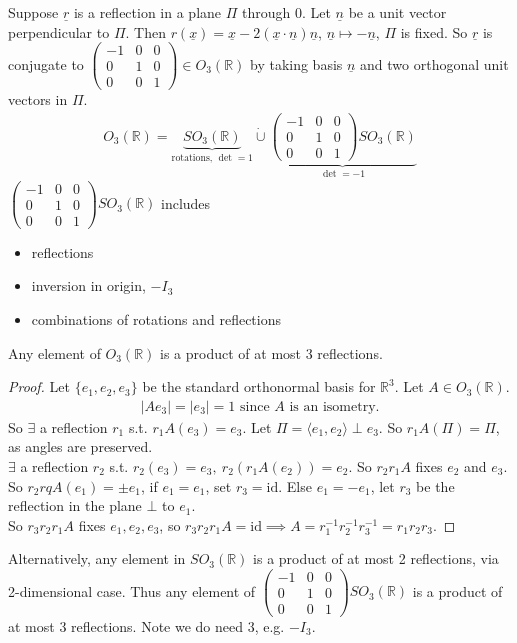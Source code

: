 Suppose $\underline{r}$ is a reflection in a plane $\Pi$ through 0.
Let $\underline{n}$ be a unit vector perpendicular to $\Pi$.
Then $r(\underline{x}) = \underline{x} - 2 (\underline{x} \cdot \underline{n}) \underline{n}$, $\underline{n} \mapsto - \underline{n}$, $\Pi$ is fixed.
So $\underline{r}$ is conjugate to $\begin{pmatrix}-1 & 0 & 0 \\0 & 1 & 0 \\0 & 0 & 1\end{pmatrix} \in O_3(\mathbb{R})$ by taking basis $\underline{n}$ and two orthogonal unit vectors in $\Pi$.
\begin{align*}
    O_3(\mathbb{R}) = \underbrace{SO_3(\mathbb{R})}_\text{rotations, $\det = 1$} \mathbin{\dot{\cup}} \underbrace{\begin{pmatrix}-1 & 0 & 0 \\0 & 1 & 0 \\0 & 0 & 1\end{pmatrix} SO_3(\mathbb{R})}_{\det = -1}
\end{align*} 
$\begin{pmatrix}-1 & 0 & 0 \\0 & 1 & 0 \\0 & 0 & 1\end{pmatrix} SO_3(\mathbb{R})$ includes
\begin{itemize}
    \item reflections
    \item inversion in origin, $-I_3$
    \item combinations of rotations and reflections
\end{itemize} 

\begin{theorem}\label{thm:13}
    Any element of $O_3(\mathbb{R})$ is a product of at most 3 reflections.
\end{theorem} 

\begin{proof}
    Let $\{e_1, e_2, e_3\}$ be the standard orthonormal basis for $\mathbb{R}^3$.
    Let $A \in O_3(\mathbb{R})$.
    \begin{align*}
        |A e_3| = |e_3| = 1 \text{ since $A$ is an isometry.}
    \end{align*} 
    So $\exists$ a reflection $r_1$ s.t. $r_1 A(e_3) = e_3$.
    Let $\Pi = \langle e_1, e_2 \rangle \mathbin{\bot} e_3$.
    So $r_1 A(\Pi) = \Pi$, as angles are preserved. \\
    $\exists$ a reflection $r_2$ s.t. $r_2(e_3) = e_3,\ r_2(r_1 A (e_2)) = e_2$.
    So $r_2 r_1 A$ fixes $e_2$ and $e_3$. \\
    So $r_2 rq A (e_1) = \pm e_1$, if $e_1 = e_1$, set $r_3 = \text{id}$.
    Else $e_1 = - e_1$, let $r_3$ be the reflection in the plane $\bot$ to $e_1$. \\
    So $r_3 r_2 r_1 A$ fixes $e_1, e_2, e_3$, so $r_3 r_2 r_1 A = \text{id} \implies A = r_1^{-1} r_2^{-1} r_3^{-1} = r_1 r_2 r_3$.
\end{proof} 

Alternatively, any element in $SO_3(\mathbb{R})$ is a product of at most 2 reflections, via 2-dimensional case.
Thus any element of $\begin{pmatrix}-1 & 0 & 0 \\0 & 1 & 0 \\0 & 0 & 1\end{pmatrix} SO_3(\mathbb{R})$ is a product of at most 3 reflections.
Note we do need $3$, e.g. $-I_3$.